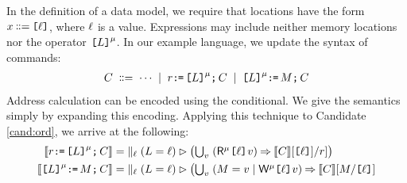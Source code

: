 In the definition of a data model, we require
that locations have the form $x\!\!\;\mathrel{\mathord{\vcentcolon}\mkern-1mu\mathord{\vcentcolon}\mathord{{=}}}\;\!\!\texttt{[}\ell\texttt{]}$, where $\ell$
is a value.  Expressions may include neither memory locations nor the
operator $\texttt{[}L\texttt{]}^{\mu}$.
In our example language, we update the syntax of commands:
\begin{gather*}
  C
  \;\mathrel{\mathord{\vcentcolon}\mkern-1mu\mathord{\vcentcolon}\mathord{{=}}}\; \cdots
  \;\mathrel{|}\; r\texttt{:}\mkern-1mu\texttt{=}\,\texttt{[}L\texttt{]}^{\mu}\texttt{;}\,\allowbreak C 
  \;\mathrel{|}\; \texttt{[}L\texttt{]}^{\mu}\texttt{:}\mkern-1mu\texttt{=}\,M\texttt{;}\,\allowbreak C
\end{gather*}
Address calculation can be encoded using the conditional.  We give the
semantics simply by expanding this encoding.  Applying this technique to Candidate
\ref{cand:ord}, we arrive at the following:
  \begin{align*}
  \sem{\aReg\GETS\REF{\cExp}^\amode\SEMI \aCmd} & =
    \;\textstyle\parallel_\cVal (\cExp=\cVal) \guard \bigl(
    \textstyle\bigcup_\aVal\;
    (\DRmode{\REF{\cVal}}\aVal) \prefix \sem{\aCmd} [\REF{\cVal}]/\aReg]
    \bigr)
    \\
  \sem{\REF{\cExp}^\amode\GETS\aExp\SEMI \aCmd} & =
    \;\textstyle\parallel_\cVal (\cExp=\cVal) \guard 
    \bigl(\textstyle\bigcup_\aVal\; (\aExp=\aVal \mid \DWmode{\REF{\cVal}}\aVal) \prefix \sem{\aCmd}[\aExp/\REF{\cVal}]
  \end{align*}
